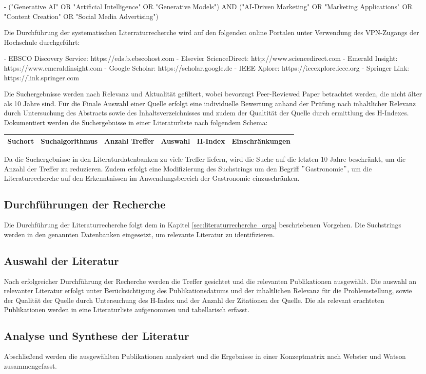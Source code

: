 \documentclass[11pt]{article}
\begin{document}
- ("Generative AI" OR "Artificial Intelligence" OR "Generative Models") AND ("AI-Driven Marketing" OR "Marketing Applications" OR "Content Creation" OR "Social Media Advertising")

Die Durchführung der systematischen Literraturrecherche wird auf den folgenden online Portalen unter Verwendung des VPN-Zugangs der Hochschule durchgeführt:

- EBSCO Discovery Service: https://eds.b.ebscohost.com
- Elsevier ScienceDirect: http://www.sciencedirect.com
- Emerald Insight: https://www.emeraldinsight.com
- Google Scholar: https://scholar.google.de
- IEEE Xplore: https://ieeexplore.ieee.org
- Springer Link: https://link.springer.com

Die Suchergebnisse werden nach Relevanz und Aktualität gefiltert, wobei bevorzugt Peer-Reviewed Paper betrachtet werden, die nicht älter als 10 Jahre sind.
Für die Finale Auswahl einer Quelle erfolgt eine individuelle Bewertung anhand der Prüfung nach inhaltlicher Relevanz durch Untersuchung des Abstracts sowie des Inhaltsverzeichnisses und zudem der Qualtität der Quelle durch ermittlung des H-Indexes.
Dokumentiert werden die Suchergebnisse in einer Literaturliste nach folgendem Schema:

\begin{tabular}{|l|l|l|l|l|l|}
\hline
Suchort & Suchalgorithmus & Anzahl Treffer & Auswahl & H-Index & Einschränkungen \\ \hline
\end{tabular}

Da die Suchergebnisse in den Literaturdatenbanken zu viele Treffer liefern, wird die Suche auf die letzten 10 Jahre beschränkt, um die Anzahl der Treffer zu reduzieren.
Zudem erfolgt eine Modifizierung des Suchstrings um den Begriff \("\)Gastronomie\("\), um die Literaturrecherche auf den Erkenntnissen im Anwendungsbereich der Gastronomie einzuschränken.



\subsection{Durchführungen der Recherche}

Die Durchführung der Literaturrecherche folgt dem in Kapitel \ref{sec:literaturrecherche_orga} beschriebenen Vorgehen.
Die Suchstrings werden in den genannten Datenbanken eingesetzt, um relevante Literatur zu identifizieren.

\subsection{Auswahl der Literatur}
Nach erfolgreicher Durchführung der Recherche werden die Treffer gesichtet und die relevanten Publikationen ausgewählt.
Die auswahl an relevanter Literatur erfolgt unter Berücksichtigung des Publikationsdatums und der inhaltlichen Relevanz für die Problemstellung, sowie der Qualität der Quelle durch Untersuchung des H-Index und der Anzahl der Zitationen der Quelle.
Die als relevant erachteten Publikationen werden in eine Literaturliste aufgenommen und tabellarisch erfasst.

\subsection{Analyse und Synthese der Literatur}
Abschließend werden die ausgewählten Publikationen analysiert und die Ergebnisse in einer Konzeptmatrix nach Webster und Watson zusammengefasst.
\end{document}
